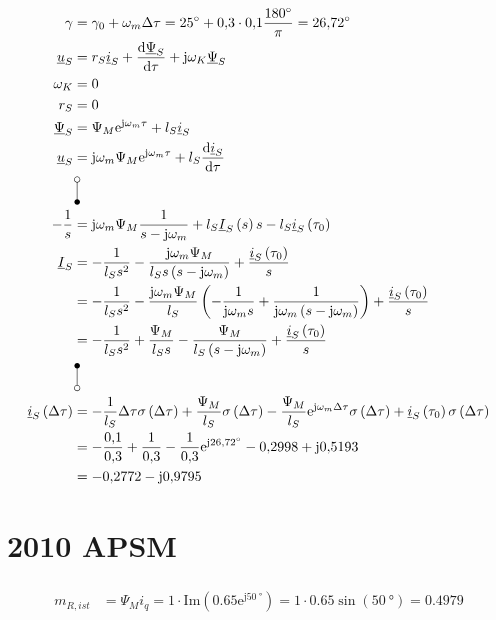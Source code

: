 \documentclass[11pt,a4paper]{scrartcl}
\newcommand{\mybr}[1]{\left(#1\right)}
\renewcommand{\j}{\mathrm{j}}
\renewcommand{\u}{\underline{u}}
\newcommand{\I}{\underline{I}}
\renewcommand{\i}{\underline{i}}
\newcommand{\PPsi}{\underline{\Psi}}
\newcommand{\0}{_{\mybr{0}}}
\newcommand{\1}{_{\mybr{1}}}
\newcommand{\2}{_{\mybr{2}}}
\renewcommand{\e}{\mathrm{e}}
\renewcommand{\d}{\mathrm{d}}
\renewcommand{\Im}{\mathrm{Im}}
\begin{document}
\section{}
\begin{align}
\gamma&=\gamma_0+\omega_m\Delta\tau=\SI{25}{\degree}+\num{0.3}\cdot\num{0.1}\frac{\SI{180}{\degree}}{\pi}=\SI{26.72}{\degree}\\
\u_S&=r_S\i_S+\frac{\d\PPsi_S}{\d\tau}+\j\omega_K\PPsi_S\\
\omega_K&=0\\
r_S&=0\\
\PPsi_S&=\Psi_M\e^{\j\omega_m\tau}+l_S\i_S\\
\u_S&=\j\omega_m\Psi_M\e^{\j\omega_m\tau}+l_S\frac{\d\i_S}{\d\tau}\\
&\rotatebox[origin=c]{270}{\laplace}\nonumber\\
-\frac{1}{s}&=\j\omega_m\Psi_M\frac{1}{s-\j\omega_m}+l_S\I_S\mybr{s}s-l_S\i_S\mybr{\tau_0}\\
\I_S&=-\frac{1}{l_S s^2}-\frac{\j\omega_m\Psi_M}{l_S s\mybr{s-\j\omega_m}}+\frac{\i_S\mybr{\tau_0}}{s}\\
&=-\frac{1}{l_S s^2}-\frac{\j\omega_m\Psi_M}{l_S}\mybr{-\frac{1}{\j\omega_m s}+\frac{1}{\j\omega_m\mybr{s-\j\omega_m}}}+\frac{\i_S\mybr{\tau_0}}{s}\\
&=-\frac{1}{l_S s^2}+\frac{\Psi_M}{l_S s}-\frac{\Psi_M}{l_S\mybr{s-\j\omega_m}}+\frac{\i_S\mybr{\tau_0}}{s}\\
&\rotatebox[origin=c]{270}{\Laplace}\nonumber\\
\i_S\mybr{\Delta\tau}&=-\frac{1}{l_S}\Delta\tau\sigma\mybr{\Delta\tau}+\frac{\Psi_M}{l_S}\sigma\mybr{\Delta\tau}-\frac{\Psi_M}{l_S}\e^{\j\omega_m\Delta\tau}\sigma\mybr{\Delta\tau}+\i_S\mybr{\tau_0}\sigma\mybr{\Delta\tau}\\
&=-\frac{\num{0.1}}{\num{0.3}}+\frac{1}{\num{0.3}}-\frac{1}{\num{0.3}}\e^{\j\SI{26.72}{\degree}}-\num{0.2998}+\j\num{0.5193}\\
&=\num{-0.2772}-\j\num{0.9795}
\end{align}

\clearpage
\part{2010 APSM}
\section{}
\begin{align}
m_{R,ist}&=\Psi_M i_q=1\cdot\Im\mybr{\num{0.65}\e^{\j\SI{50}{\degree}}}=1\cdot\num{0.65}\sin\mybr{\SI{50}{\degree}}=\num{0.4979}
\end{align}
\end{document}
